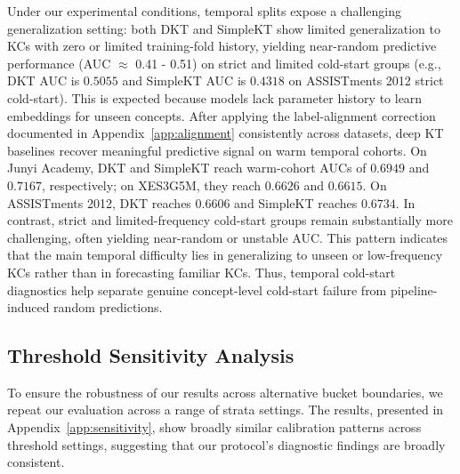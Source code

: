 Under our experimental conditions, temporal splits expose a challenging generalization setting: both DKT and SimpleKT show limited generalization to KCs with zero or limited training-fold history, yielding near-random predictive performance (AUC $\approx$ 0.41 - 0.51) on strict and limited cold-start groups (e.g., DKT AUC is $0.5055$ and SimpleKT AUC is $0.4318$ on ASSISTments 2012 strict cold-start). This is expected because models lack parameter history to learn embeddings for unseen concepts. After applying the label-alignment correction documented in Appendix~\ref{app:alignment} consistently across datasets, deep KT baselines recover meaningful predictive signal on warm temporal cohorts. On Junyi Academy, DKT and SimpleKT reach warm-cohort AUCs of $0.6949$ and $0.7167$, respectively; on XES3G5M, they reach $0.6626$ and $0.6615$. On ASSISTments 2012, DKT reaches $0.6606$ and SimpleKT reaches $0.6734$. In contrast, strict and limited-frequency cold-start groups remain substantially more challenging, often yielding near-random or unstable AUC. This pattern indicates that the main temporal difficulty lies in generalizing to unseen or low-frequency KCs rather than in forecasting familiar KCs. Thus, temporal cold-start diagnostics help separate genuine concept-level cold-start failure from pipeline-induced random predictions.

\subsection{Threshold Sensitivity Analysis}
To ensure the robustness of our results across alternative bucket boundaries, we repeat our evaluation across a range of strata settings. The results, presented in Appendix~\ref{app:sensitivity}, show broadly similar calibration patterns across threshold settings, suggesting that our protocol's diagnostic findings are broadly consistent.

